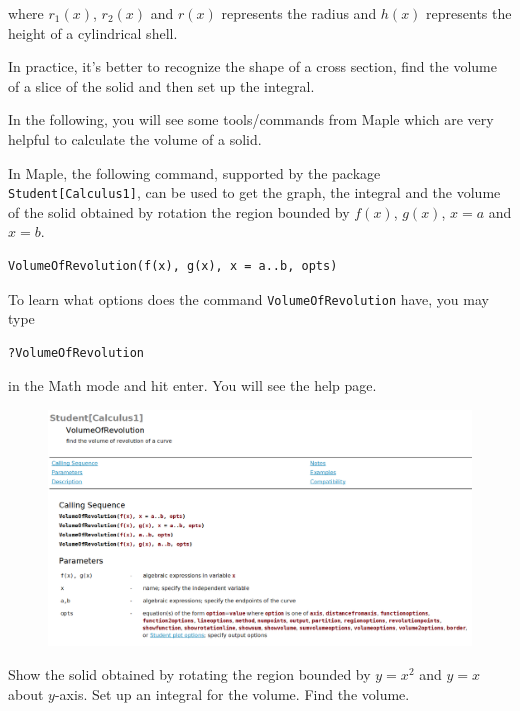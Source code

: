 \documentclass[]{book}
\theoremstyle{definition}
\theoremstyle{definition}
\theoremstyle{definition}
\theoremstyle{remark}
\let\BeginKnitrBlock\begin \let\EndKnitrBlock\end
\begin{document}
where \(r_1(x)\), \(r_2(x)\) and \(r(x)\) represents the radius and
\(h(x)\) represents the height of a cylindrical shell.

In practice, it's better to recognize the shape of a cross section, find
the volume of a slice of the solid and then set up the integral.

In the following, you will see some tools/commands from Maple which are
very helpful to calculate the volume of a solid.

In Maple, the following command, supported by the package
\texttt{Student{[}Calculus1{]}}, can be used to get the graph, the
integral and the volume of the solid obtained by rotation the region
bounded by \(f(x)\), \(g(x)\), \(x=a\) and \(x=b\).

\begin{verbatim}
VolumeOfRevolution(f(x), g(x), x = a..b, opts)
\end{verbatim}

To learn what options does the command \texttt{VolumeOfRevolution} have,
you may type

\begin{verbatim}
?VolumeOfRevolution
\end{verbatim}

in the Math mode and hit enter. You will see the help page.

\begin{figure}
\centering
\includegraphics{figs/VolOfRev-help-page.png}
\caption{}
\end{figure}

\BeginKnitrBlock{example}
\protect\hypertarget{exm:unnamed-chunk-1}{}{\label{exm:unnamed-chunk-1}
}Show the solid obtained by rotating the region bounded by \(y=x^2\) and
\(y=x\) about \(y\)-axis. Set up an integral for the volume. Find the
volume.
\EndKnitrBlock{example}
\end{document}
